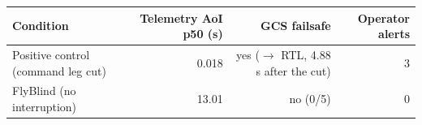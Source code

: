 \begin{tabular}{lrrr}
\toprule
Condition & Telemetry AoI p50 (s) & GCS failsafe & Operator alerts \\
\midrule
Positive control (command leg cut) & 0.018 & yes ($\rightarrow$ RTL, 4.88 s after the cut) & 3 \\
FlyBlind (no interruption) & 13.01 & no (0/5) & 0 \\
\bottomrule
\end{tabular}
